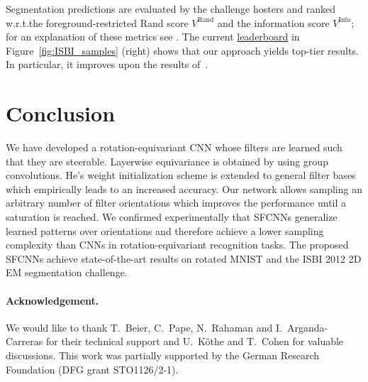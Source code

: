\documentclass[10pt,twocolumn,letterpaper]{article}
\begin{document}
Segmentation predictions are evaluated by the challenge hosters and ranked w.r.t.\@ the foreground-restricted Rand score $V^\text{Rand}$ and the information score $V^\text{Info}$; for an explanation of these metrics see \cite{arganda2015crowdsourcing}.
The current
\href{http://brainiac2.mit.edu/isbi_challenge/leaders-board-new}{leaderboard}
in Figure~\ref{fig:ISBI_samples} (right) shows that our approach yields top-tier results.
In particular, it improves upon the results of~\cite{beier2017multicut}.




\vspace{-.25ex}
\section{Conclusion}
\vspace{-.5ex}

We have developed a rotation-equivariant CNN whose filters are learned such that they are steerable.
Layerwise equivariance is obtained by using group convolutions.
He's weight initialization scheme is extended to general filter bases which empirically leads to an increased accuracy.
Our network allows sampling an arbitrary number of filter orientations which improves the performance until a saturation is reached.
We confirmed experimentally that \mbox{SFCNNs} generalize learned patterns over orientations and therefore achieve a lower sampling complexity than CNNs in rotation-equivariant recognition tasks.
The proposed \mbox{SFCNNs} achieve state-of-the-art results on rotated MNIST and the ISBI 2012 2D EM segmentation challenge.





\paragraph*{Acknowledgement.}
We would like to thank
T.~Beier, C.~Pape, N.~Rahaman and I.~Arganda-Carreras for their technical support
and U.~K\"othe and T.~Cohen for valuable discussions.
This work was partially supported by the German Research Foundation (DFG grant STO1126/2-1).










\appendix
{}\\
\end{document}
